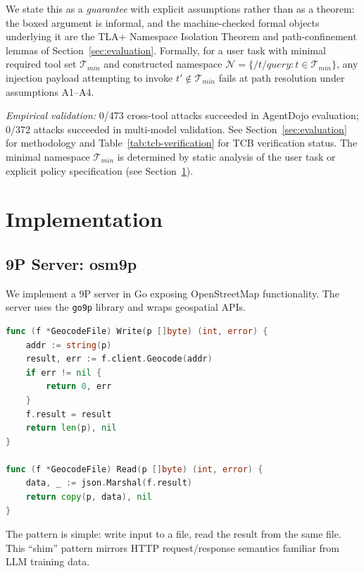 \documentclass{article}
\begin{document}
\noindent We state this as a \textit{guarantee} with explicit assumptions rather than as a theorem: the boxed argument is informal, and the machine-checked formal objects underlying it are the TLA+ Namespace Isolation Theorem and path-confinement lemmas of Section~\ref{sec:evaluation}. Formally, for a user task with minimal required tool set $\mathcal{T}_{min}$ and constructed namespace $\mathcal{N} = \{/t/query : t \in \mathcal{T}_{min}\}$, any injection payload attempting to invoke $t' \notin \mathcal{T}_{min}$ fails at path resolution under assumptions A1--A4.

\noindent\textit{Empirical validation:} 0/473 cross-tool attacks succeeded in AgentDojo evaluation; 0/372 attacks succeeded in multi-model validation. See Section~\ref{sec:evaluation} for methodology and Table~\ref{tab:tcb-verification} for TCB verification status. The minimal namespace $\mathcal{T}_{min}$ is determined by static analysis of the user task or explicit policy specification (see Section~\ref{sec:implementation}).

\section{Implementation}
\label{sec:implementation}

\subsection{9P Server: osm9p}

We implement a 9P server in Go exposing OpenStreetMap functionality. The server uses the \texttt{go9p} library and wraps geospatial APIs.

\begin{lstlisting}[language=Go,caption={9P file handler for geocoding}]
func (f *GeocodeFile) Write(p []byte) (int, error) {
    addr := string(p)
    result, err := f.client.Geocode(addr)
    if err != nil {
        return 0, err
    }
    f.result = result
    return len(p), nil
}

func (f *GeocodeFile) Read(p []byte) (int, error) {
    data, _ := json.Marshal(f.result)
    return copy(p, data), nil
}
\end{lstlisting}

The pattern is simple: write input to a file, read the result from the same file. This ``shim'' pattern mirrors HTTP request/response semantics familiar from LLM training data.
\end{document}
